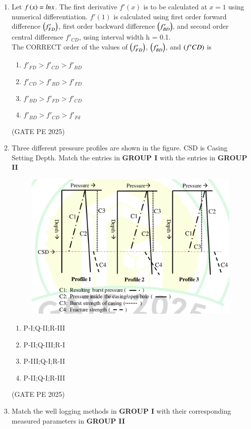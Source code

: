 \documentclass[journal,12pt,onecolumn]{IEEEtran}
\theoremstyle{remark}
\begin{document}
\begin{enumerate}
\item Let $f\left(x\right)=ln x$. The first derivative $f'(x)$ is to be calculated at $x=1$ using numerical differentiation. $f'(1)$ is calculated using first order forward difference $\left(f'_{FD}\right)$, first order backward difference $\left(f'_{BD}\right)$, and second order central difference $f'_{CD}$, using interval width h = 0.1.\\
The CORRECT order of the values of $\left(f'_{FD}\right)$, $\left(f'_{BD}\right)$, and $\left(f'{CD}\right)$ is
\begin{enumerate}
    \item $f'_{FD}>f'_{CD}>f'_{BD}$
    \item $f'_{CD}>f'_{BD}>f'_{FD}$
    \item $f'_{BD}>f'_{FD}>f'_{CD}$
    \item $f'_{BD}>f'_{CD}>f'_{Fd}$
\end{enumerate}
\hfill{(GATE PE 2025)}

\item Three different pressure profiles are shown in the figure. CSD is Casing Setting Depth.
Match the entries in \textbf{GROUP I} with the entries in \textbf{GROUP II}\\


\begin{figure}[H]
    \centering
    \includegraphics[width=0.5\columnwidth]{25Q38.png}
    \caption{}
    \label{fig:placeholder}
\end{figure}
\begin{enumerate}
    \item P-I;Q-II;R-III
    \item P-II;Q-III;R-I
    \item P-III;Q-I;R-II
    \item P-II;Q-I;R-III
\end{enumerate}
\hfill{(GATE PE 2025)}

\item Match the well logging methods in \textbf{GROUP I} with their corresponding measured parameters in \textbf{GROUP II}\\


\end{enumerate}
\end{document}
